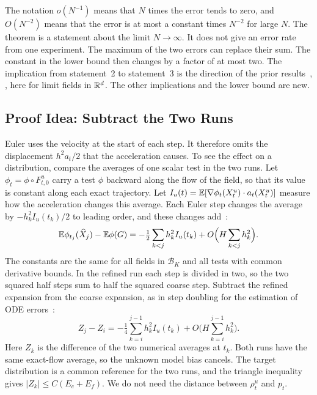 The notation $o(N^{-1})$ means that $N$ times the error tends to zero,
and $O(N^{-2})$ means that the error is at most a constant times
$N^{-2}$ for large $N$. The theorem is a statement about the limit
$N\to\infty$. It does not give an error rate from one experiment. The
maximum of the two errors can replace their sum. The constant in the
lower bound then changes by a factor of at most two. The implication
from statement~2 to statement~3 is the direction of the prior
results~\citep[Theorem~2]{obzherin2026density}, \citep[Corollary~8]{obzherin2026finite},
here for limit fields in $\mathbb R^d$. The other implications and the lower
bound are new.

\subsection{Proof Idea: Subtract the Two Runs}
Euler uses the velocity at the start of each step. It therefore omits
the displacement $h^2a_t/2$ that the acceleration causes. To see the
effect on a distribution, compare the averages of one scalar test in the
two runs. Let $\phi_t=\phi\circ F^u_{t,0}$ carry a test $\phi$ backward
along the flow of the field, so that its value is constant along each
exact trajectory. Let $I_u(t)=\mathbb E[\nabla\phi_t(X_t^u)\cdot a_t(X_t^u)]$
measure how the acceleration changes this average. Each Euler step
changes the average by $-h_k^2I_u(t_k)/2$ to leading order, and these
changes add~\citep{talay1990expansion}:
\[
 \mathbb E\phi_{t_j}(\widehat X_j)-\mathbb E\phi(G)=-\tfrac12\sum_{k<j}h_k^2I_u(t_k)
 +O\Big(H\sum_{k<j}h_k^2\Big).
\]
The constants are the same for all fields in $\mathcal B_K$ and all
tests with common derivative bounds. In the refined run each step is
divided in two, so the two squared half steps sum to half the squared
coarse step. Subtract the refined expansion from the coarse expansion,
as in step doubling for the estimation of ODE
errors~\citep{richardson1911approximate,hairer1993solving}:
\begin{equation}\label{eq:contrast-main}
 Z_j-Z_i=-\tfrac14\sum_{k=i}^{j-1}h_k^2I_u(t_k)
 +O\Big(H\sum_{k=i}^{j-1}h_k^2\Big).
\end{equation}
Here $Z_k$ is the difference of the two numerical averages at $t_k$.
Both runs have the same exact-flow average, so the unknown model bias
cancels. The target distribution is a common reference for the two runs,
and the triangle inequality gives $|Z_k|\le C(E_c+E_f)$. We do not need
the distance between $\rho_t^u$ and $p_t$.

